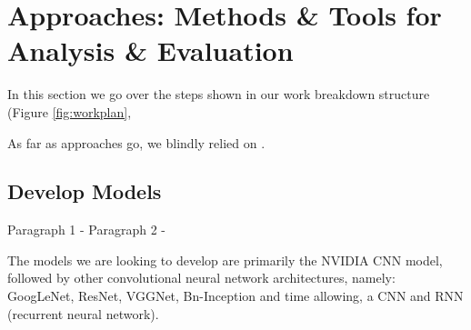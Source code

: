 \section{Approaches: Methods \& Tools for Analysis \& Evaluation}
In this section we go over the steps shown in our work breakdown structure (Figure \ref{fig:workplan},

As far as approaches go, we blindly relied on \cite{Oates:2006}.

\lipsum[5]






\subsection{Develop Models}

Paragraph 1 - \lipsum[10]
Paragraph 2 - \lipsum[11]

The models we are looking to develop are primarily the NVIDIA CNN model, followed by other convolutional neural network architectures, namely: GoogLeNet, ResNet, VGGNet, Bn-Inception and time allowing, a CNN and RNN (recurrent neural network).






